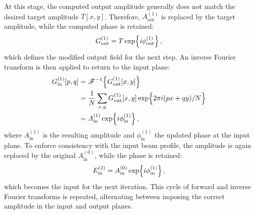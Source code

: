 \documentclass[../Thesis-IJspeert.tex]{subfiles}
\begin{document}
At this stage, the computed output amplitude generally does not match the desired target amplitude $T[x,y]$. Therefore, $A_{\mathrm{out}}^{(1)} $ is replaced by the target amplitude, while the computed phase is retained:
\begin{equation}
\label{Gout}
G_{\mathrm{out}}^{(1)} = T \exp\Bigl\{i \phi_{\mathrm{out}}^{(1)}\Bigr\}\,,
\end{equation}
which defines the modified output field for the next step. An inverse Fourier transform is then applied to return to the input plane:
\begin{align}
\begin{split}
G_{\mathrm{in}}^{(1)}[p,q] &= \mathcal{F}^{-1}\Bigl\{G_{\mathrm{out}}^{(1)}[x,y] \Bigr\} \\&= \frac{1}{N}\sum_{x,y} G_{\mathrm{out}}^{(1)}[x,y] \exp\Bigl\{2\pi i (px + qy) /N \Bigr\} \\&= A_{\mathrm{in}}^{(1)} \exp\Bigl\{ i \phi_{\mathrm{in}}^{(1)}\Bigr\}\,,
\end{split}
\end{align}
where $A_{\mathrm{in}}^{(1)}$ is the resulting amplitude and $\phi_{\mathrm{in}}^{(1)}$ the updated phase at the input plane. To enforce consistency with the input beam profile, the amplitude is again replaced by the original $A_{\mathrm{in}}^{(0)}$, while the phase is retained:
\begin{equation}
E_{\mathrm{in}}^{(2)} = A_{\mathrm{in}}^{(0)} \exp\Bigl\{i \phi_{\mathrm{in}}^{(1)} \Bigr\}\,,
\end{equation}
which becomes the input for the next iteration. This cycle of forward and inverse Fourier transforms is repeated, alternating between imposing the correct amplitude in the input and output planes.
\end{document}
